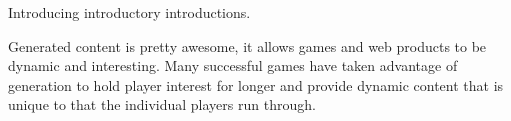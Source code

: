 Introducing introductory introductions.

Generated content is pretty awesome, it allows games and web products to be 
dynamic and interesting. Many successful games have taken advantage of 
generation to hold player interest for longer and provide dynamic content that is
unique to that the individual players run through.
